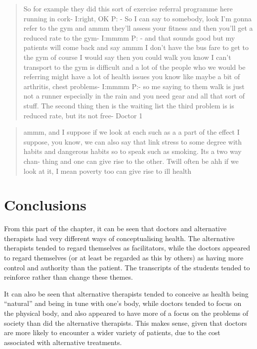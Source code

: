\begin{quotation}
  So for example they did this sort of exercise referral programme here running in cork-
I:right, OK
P: - So I can say to somebody, look I'm gonna refer to the gym and ammm they'll assess your fitness  and then you'll get a reduced rate to the gym-
I:mmmm
P: - and that sounds good but my patients will come back and say ammm I don't have the bus fare to get to the gym of course I would say then you could walk you know I can't transport to the gym is difficult and a lot of the people who we would be referring might have a lot of health issues you know like maybe a bit of arthritis, chest problems-
I:mmmm
P:- so me saying to them walk is just not a runner especially in the rain and you need gear and all that sort of stuff. The second thing then is the waiting list the third problem is is reduced rate, but its not free-
Doctor 1
\end{quotation}


\begin{quotation}
  ammm, and I suppose if we look at each such as a a part of the effect I suppose, you know, we can also say that link stress to some degree with habits and dangerous habits so to speak such as smoking. Its a two way chan- thing and one can give rise to the other. Twill often be ahh if we look at it, I mean poverty too can give rise to ill health
\end{quotation}


\section{Conclusions}
\label{sec:conclusions}

From this part of the chapter, it can be seen that doctors and alternative therapists had very different ways of conceptualising health. The alternative therapists tended to regard themselves as facilitators, while the doctors appeared to regard themselves (or at least be regarded as this by others) as having more control and authority than the patient. 
The transcripts of the students tended to reinforce rather than change these themes. 

It can also be seen that alternative therapists tended to conceive as health being ``natural'' and being in tune with one's body, while doctors tended to focus on the physical body, and also appeared to have more of a focus on the problems of society than did the alternative therapists. This makes sense, given that doctors are more likely to encounter a wider variety of patients, due to the cost associated with alternative treatments. 

